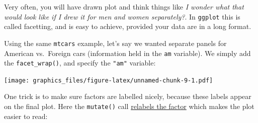 \documentclass[]{article}
\newenvironment{Shaded}{\begin{snugshade}}{\end{snugshade}}
\newcommand{\KeywordTok}[1]{\textcolor[rgb]{0.13,0.29,0.53}{\textbf{#1}}}
\newcommand{\DataTypeTok}[1]{\textcolor[rgb]{0.13,0.29,0.53}{#1}}
\newcommand{\DecValTok}[1]{\textcolor[rgb]{0.00,0.00,0.81}{#1}}
\newcommand{\StringTok}[1]{\textcolor[rgb]{0.31,0.60,0.02}{#1}}
\newcommand{\OperatorTok}[1]{\textcolor[rgb]{0.81,0.36,0.00}{\textbf{#1}}}
\newcommand{\NormalTok}[1]{#1}
\theoremstyle{definition}
\theoremstyle{definition}
\theoremstyle{definition}
\theoremstyle{remark}
\begin{document}
Very often, you will have drawn plot and think things like \emph{I
wonder what that would look like if I drew it for men and women
separately?}. In \texttt{ggplot} this is called facetting, and is easy
to achieve, provided your data are in a long format.

Using the same \texttt{mtcars} example, let's say we wanted separate
panels for American vs.~Foreign cars (information held in the
\texttt{am} variable). We simply add the \texttt{facet\_wrap()}, and
specify the \texttt{"am"} variable:

\begin{Shaded}
\end{Shaded}

\texttt{[image: graphics\_files/figure-latex/unnamed-chunk-9-1.pdf]}

One trick is to make sure factors are labelled nicely, because these
labels appear on the final plot. Here the \texttt{mutate()} call
\href{real-data.html\#factors-and-numerics}{relabels the factor} which
makes the plot easier to read:

\begin{Shaded}
\end{Shaded}
\end{document}
